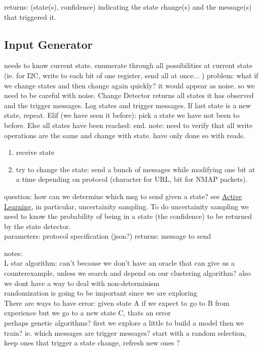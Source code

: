 \documentclass[11pt, a4paper]{article}
\begin{document}
returns: (state(s), confidence) indicating the state change(s) and the message(s) that triggered it.

\subsection*{Input Generator}

needs to know current state.
enumerate through all possibilities at current state (ie. for I2C, write to each bit of one register, send all at once... )
problem: what if we change states and then change again quickly? it would appear as noise. so we need to be careful with noise.
Change Detector returns all states it has observed and the trigger messages.
Log states and trigger messages.
If last state is a new state, repeat. 
Elif (we have seen it before): pick a state we have not been to before.
Else all states have been reached: end.
note: need to verify that all write operations are the same and change with state. have only done so with reads.

\begin{enumerate}
    \item receive state
    \item try to change the state: send a bunch of messages while modifying one bit at a time depending on protocol (character for URL, bit for NMAP packets).
\end{enumerate}

question: how can we determine which msg to send given a state? see \href{https://en.wikipedia.org/wiki/Active_learning_(machine_learning)}{Active Learning}, in particular, uncertainity sampling.
To do uncertainity sampling we need to know the probability of being in a state (the confidence) to be returned by the state detector. \\

parameters: protocol specification (json?)
returns: message to send

notes:\\
L star algorithm: can't because we don't have an oracle that can give us a counterexample, unless we search and depend on our clustering algorithm?
also we dont have a way to deal with non-determinism\\
randomization is going to be important since we are exploring\\
There are ways to have error: given state A if we expect to go to B from experience but we go to a new state C, thats an error\\
perhaps genetic algorithms? first we explore a little to build a model then we train? 
ie. which messages are trigger messages? start with a random selection,
keep ones that trigger a state change, 
refresh new ones ? \\
\end{document}
